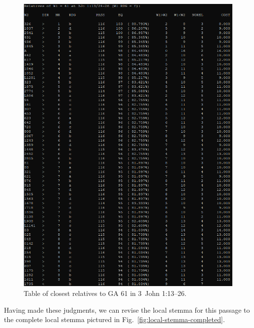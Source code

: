 \documentclass[a4paper, 12pt]{article}
\begin{document}
	\newpage
	
	\begin{figure}[h!]
		\centering
		\includegraphics[width=\textwidth]{../graphics/find-relatives-61-B25K1V13U24-26.png}
		\caption{Table of closest relatives to GA 61 in 3~John 1:13–26.}
		\label{fig:find-relatives-61-B25K1V13U24-26}
	\end{figure}
	
	\newpage
	
	Having made these judgments, we can revise the local stemma for this passage to the complete local stemma pictured in Fig.~\ref{fig:local-stemma-completed}.
	
\end{document}
